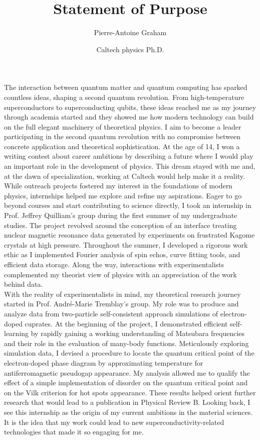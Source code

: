 \documentclass[12pt]{article}
\title{Statement of Purpose}
\author{Pierre-Antoine Graham}
\date{Caltech physics Ph.D.}
\begin{document}
\maketitle
\vspace{0.5cm}

The interaction between quantum matter and quantum computing has sparked countless ideas, shaping a second quantum revolution. From high-temperature superconductors to superconducting qubits, these ideas reached me as my journey through academia started and they showed me how modern technology can build on the full elegant machinery of theoretical physics. I aim to become a leader participating in the second quantum revolution with no compromise between concrete application and theoretical sophistication. At the age of 14, I won a writing contest about career ambitions by describing a future where I would play an important role in the development of physics. This dream stayed with me and, at the dawn of specialization, working at Caltech would help make it a reality.\\[0.2cm]

While outreach projects fostered my interest in the foundations of modern physics, internships helped me explore and refine my aspirations. Eager to go beyond courses and start contributing to science directly, I took an internship in Prof. Jeffrey Quilliam's group during the first summer of my undergraduate studies. The project revolved around the conception of an interface treating nuclear magnetic resonance data generated by experiments on frustrated Kagome crystals at high pressure. Throughout the summer, I developed a rigorous work ethic as I implemented Fourier analysis of spin echos, curve fitting tools, and efficient data storage. Along the way, interactions with experimentalists complemented my theorist view of physics with an appreciation of the work behind data.\\[0.2cm]

With the reality of experimentalists in mind, my theoretical research journey started in Prof. André-Marie Tremblay's group. My role was to produce and analyze data from two-particle self-consistent approach simulations of electron-doped cuprates. At the beginning of the project, I demonstrated efficient self-learning by rapidly gaining a working understanding of Matsubara frequencies and their role in the evaluation of many-body functions. Meticulously exploring simulation data, I devised a procedure to locate the quantum critical point of the electron-doped phase diagram by approximating temperature for antiferromagnetic pseudogap appearance. My analysis allowed me to qualify the effect of a simple implementation of disorder on the quantum critical point and on the Vilk criterion for hot spots appearance. These results helped orient further research that would lead to a publication in Physical Review B. Looking back, I see this internship as the origin of my current ambitions in the material sciences. It is the idea that my work could lead to new superconductivity-related technologies that made it so engaging for me.\\[0.2cm] 
\end{document}
